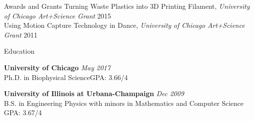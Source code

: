 \documentclass{resume} %
\begin{document}

\begin{rSection}{Awards and Grants}
Turning Waste Plastics into 3D Printing Filament, {\em University of Chicago Art+Science Grant} 2015 \\
Using Motion Capture Technology in Dance, {\em University of Chicago Art+Science Grant} 2011 
	
\end{rSection}



\begin{rSection}{Education}

{\bf University of Chicago} \hfill {\em May 2017} \\ 
Ph.D. in Biophysical Science\hfill {GPA: 3.66/4} 

{\bf University of Illinois at Urbana-Champaign} \hfill {\em Dec 2009} \\ 
B.S. in Engineering Physics with minors in Mathematics and Computer Science \hfill {GPA: 3.67/4} 

\end{rSection}
\end{document}

